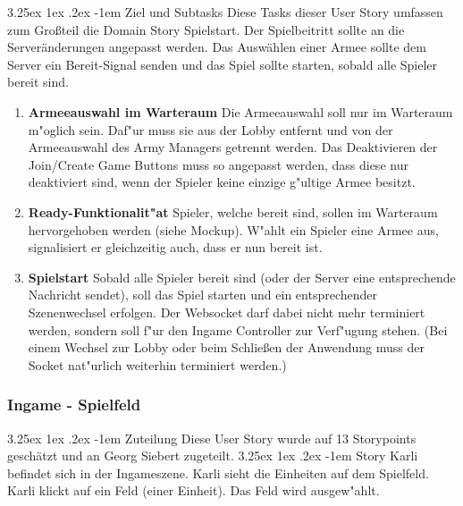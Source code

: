 \documentclass[12pt, titlepage]{scrartcl}
\makeatletter
\renewcommand\paragraph{\@startsection{paragraph}{5}{\z@}%
  {3.25ex \@plus1ex \@minus.2ex}%
  {-1em}%
  {\normalfont\normalsize\bfseries}}
\makeatother
\begin{document}
	            \paragraph{Ziel und Subtasks}
		         	Diese Tasks dieser User Story umfassen zum Gro{\ss}teil die Domain Story Spielstart.
	                	Der Spielbeitritt sollte an die Server\"anderungen angepasst werden. Das Ausw\"ahlen einer Armee sollte dem Server ein Bereit-Signal senden und das Spiel sollte starten, sobald alle Spieler bereit sind.
	                	\begin{enumerate}[label={}]
		                	\item \textbf{Armeeauswahl im Warteraum} \hspace{5pt} Die Armeeauswahl soll nur im Warteraum m"oglich sein. Daf"ur muss sie aus der Lobby entfernt und von der Armeeauswahl des Army Managers getrennt werden. Das Deaktivieren der Join/Create Game Buttons muss so angepasst werden, dass diese nur deaktiviert sind, wenn der Spieler keine einzige g"ultige Armee besitzt.
		                	\item \textbf{Ready-Funktionalit"at} \hspace{5pt} Spieler, welche bereit sind, sollen im Warteraum hervorgehoben werden (siehe Mockup). W"ahlt ein Spieler eine Armee aus, signalisiert er gleichzeitig auch, dass er nun bereit ist.
		                	\item \textbf{Spielstart} \hspace{5pt} Sobald alle Spieler bereit sind (oder der Server eine entsprechende Nachricht sendet), soll das Spiel starten und ein entsprechender Szenenwechsel erfolgen. Der Websocket darf dabei nicht mehr terminiert werden, sondern soll f"ur den Ingame Controller zur Verf"ugung stehen. (Bei einem Wechsel zur Lobby oder beim Schlie{\ss}en der Anwendung muss der Socket nat"urlich weiterhin terminiert werden.)
	                \end{enumerate}
            \subsubsection{Ingame - Spielfeld}
	            \paragraph{Zuteilung}
	                	Diese User Story wurde auf 13 Storypoints gesch\"atzt und an Georg Siebert zugeteilt.
             	\paragraph{Story}
             		Karli befindet sich in der Ingameszene. Karli sieht die Einheiten auf dem Spielfeld. Karli klickt auf ein Feld (einer Einheit). Das Feld wird ausgew"ahlt.
\end{document}
